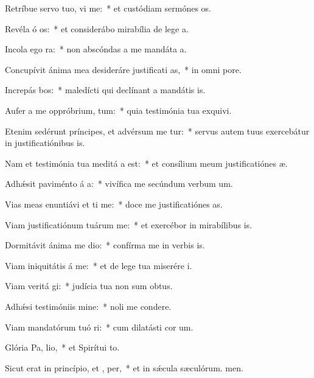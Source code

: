\item Retríbue servo tuo, vi me:~* et custódiam sermónes os.
\item Revéla ó os:~* et considerábo mirabília de lege a.
\item Incola ego   ra:~* non abscóndas a me mandáta a.
\item Concupívit ánima mea desideráre justificati as,~* in omni pore.
\item Increpás bos:~* maledícti qui declínant a mandátis is.
\item Aufer a me oppróbrium,  tum:~* quia testimónia tua exquivi.
\item Etenim sedérunt príncipes, et advérsum me tur:~* servus autem tuus exercebátur in justificatiónibus is.
\item Nam et testimónia tua meditá a est:~* et consílium meum justificatiónes æ.
\item Adhǽsit paviménto á a:~* vivífica me secúndum verbum um.
\item Vias meas enuntiávi et ti me:~* doce me justificatiónes as.
\item Viam justificatiónum tuárum  me:~* et exercébor in mirabílibus is.
\item Dormitávit ánima me  dio:~* confírma me in verbis is.
\item Viam iniquitátis á  me:~* et de lege tua miserére i.
\item Viam veritá gi:~* judícia tua non sum obtus.
\item Adhǽsi testimóniis  mine:~* noli me condere.
\item Viam mandatórum tuó ri:~* cum dilatásti cor um.
\item Glória Pa,  lio,~* et Spirítui to.
\item Sicut erat in princípio, et ,  per,~* et in sǽcula sæculórum. men.
